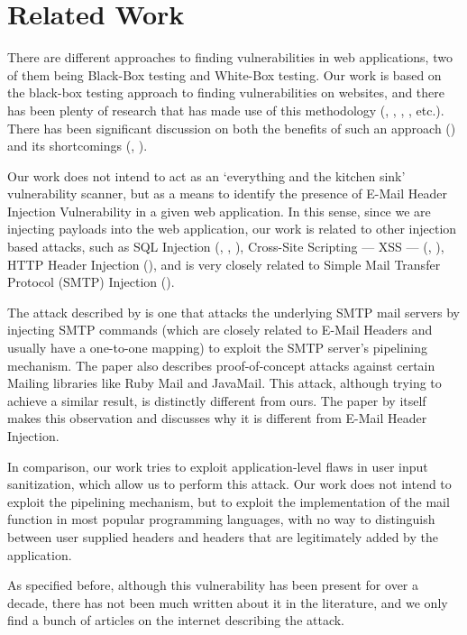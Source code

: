 \chapter{Related Work}

There are different approaches to finding vulnerabilities in web applications, two of them being Black-Box testing and White-Box testing.
Our work is based on the black-box testing approach to finding vulnerabilities on websites, and there has been plenty of research that has made use of this methodology (\cite{Beizer:1995:BTT:202699}, \cite{Huang}, \cite{zanero2005automatic}, \cite{kals2006secubat}, \cite{payet13:ears-in-the-wild} etc.). There has been significant discussion on both the benefits of such an approach (\cite{black-box}) and its shortcomings (\cite{Doupe2010}, \cite{Doupe2012}).

Our work does not intend to act as an `everything and the kitchen sink' vulnerability scanner, but as a means to identify the presence of E-Mail Header Injection Vulnerability in a given web application. In this sense, since we are injecting payloads into the web application, our work is related to other injection based attacks, such as SQL Injection (\cite{sql0}, \cite{sql1}, \cite{sql2}), Cross-Site Scripting --- XSS --- (\cite{Injection1}, \cite{KleinAmit}), HTTP Header Injection (\cite{sessionride}), and is very closely related to Simple Mail Transfer Protocol (SMTP) Injection (\cite{Terada2015}).

The attack described by \cite{Terada2015} is one that attacks the underlying SMTP mail servers by injecting SMTP commands (which are closely related to E-Mail Headers and usually have a one-to-one mapping) to exploit the SMTP server's pipelining mechanism. The paper also describes proof-of-concept attacks against certain Mailing libraries like Ruby Mail and JavaMail. This attack, although trying to achieve a similar result, is distinctly different from ours. The paper by itself makes this observation and discusses why it is different from E-Mail Header Injection.

In comparison, our work tries to exploit application-level flaws in user input sanitization, which allow us to perform this attack. Our work does not intend to exploit the pipelining mechanism, but to exploit the implementation of the mail function in most popular programming languages, with no way to distinguish between user supplied headers and headers that are legitimately added by the application.

As specified before, although this vulnerability has been present for over a decade, there has not been much written about it in the literature, and we only find a bunch of articles on the internet describing the attack.

